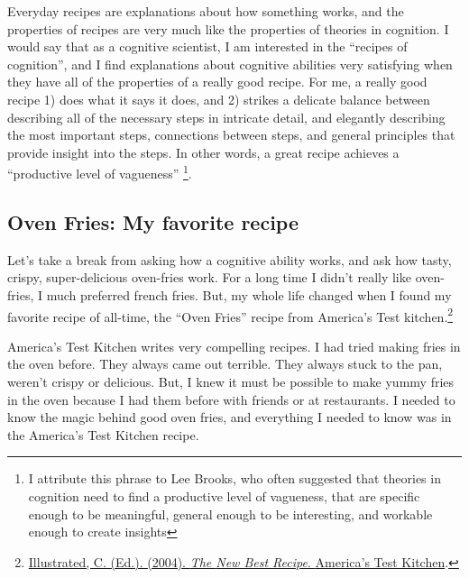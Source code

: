 \documentclass[
  oneside,
  12pt]{crumpbook}
\begin{document}
Everyday recipes are explanations about how something works, and the properties of recipes are very much like the properties of theories in cognition. I would say that as a cognitive scientist, I am interested in the ``recipes of cognition'', and I find explanations about cognitive abilities very satisfying when they have all of the properties of a really good recipe. For me, a really good recipe 1) does what it says it does, and 2) strikes a delicate balance between describing all of the necessary steps in intricate detail, and elegantly describing the most important steps, connections between steps, and general principles that provide insight into the steps. In other words, a great recipe achieves a ``productive level of vagueness'' \footnote{I attribute this phrase to Lee Brooks, who often suggested that theories in cognition need to find a productive level of vagueness, that are specific enough to be meaningful, general enough to be interesting, and workable enough to create insights}.

\hypertarget{oven-fries-my-favorite-recipe}{%
\subsection{Oven Fries: My favorite recipe}\label{oven-fries-my-favorite-recipe}}

Let's take a break from asking how a cognitive ability works, and ask how tasty, crispy, super-delicious oven-fries work. For a long time I didn't really like oven-fries, I much preferred french fries. But, my whole life changed when I found my favorite recipe of all-time, the ``Oven Fries'' recipe from America's Test kitchen.\footnote{\protect\hyperlink{ref-illustratedNewBestRecipe2004}{Illustrated, C. (Ed.). (2004). \emph{The {New Best Recipe}}. {America's Test Kitchen}}.}

America's Test Kitchen writes very compelling recipes. I had tried making fries in the oven before. They always came out terrible. They always stuck to the pan, weren't crispy or delicious. But, I knew it must be possible to make yummy fries in the oven because I had them before with friends or at restaurants. I needed to know the magic behind good oven fries, and everything I needed to know was in the America's Test Kitchen recipe.
\end{document}

